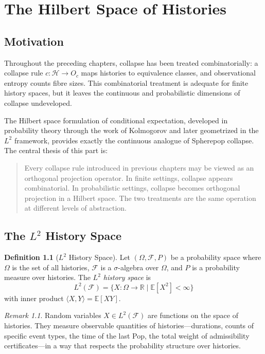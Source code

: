 \documentclass[12pt, a4paper, openany]{book}
\theoremstyle{plain}
\theoremstyle{definition}
\newtheorem{definition}[theorem]{Definition}
\theoremstyle{remark}
\newtheorem{remark}[theorem]{Remark}
\newcommand{\calH}{\mathcal{H}}
\begin{document}
\chapter{The Hilbert Space of Histories}

\section{Motivation}

Throughout the preceding chapters, collapse has been treated combinatorially:
a collapse rule $c : \calH \to O_c$ maps histories to equivalence classes, and
observational entropy counts fibre sizes. This combinatorial treatment is adequate
for finite history spaces, but it leaves the continuous and probabilistic dimensions
of collapse undeveloped.

The Hilbert space formulation of conditional expectation, developed in
probability theory through the work of Kolmogorov and later geometrized in
the $L^2$ framework, provides exactly the continuous analogue of Spherepop
collapse. The central thesis of this part is:

\begin{quote}
Every collapse rule introduced in previous chapters may be viewed as an orthogonal
projection operator. In finite settings, collapse appears combinatorial. In
probabilistic settings, collapse becomes orthogonal projection in a Hilbert space.
The two treatments are the same operation at different levels of abstraction.
\end{quote}

\section{The $L^2$ History Space}

\begin{definition}[$L^2$ History Space]
Let $(\Omega, \mathcal{F}, P)$ be a probability space where $\Omega$ is the
set of all histories, $\mathcal{F}$ is a $\sigma$-algebra over $\Omega$, and
$P$ is a probability measure over histories. The \emph{$L^2$ history space} is
\[
L^2(\mathcal{F}) = \{X : \Omega \to \mathbb{R} \mid \mathbb{E}[X^2] < \infty\}
\]
with inner product $\langle X, Y \rangle = \mathbb{E}[XY]$.
\end{definition}

\begin{remark}
Random variables $X \in L^2(\mathcal{F})$ are functions on the space of histories.
They measure observable quantities of histories---durations, counts of specific
event types, the time of the last Pop, the total weight of admissibility
certificates---in a way that respects the probability structure over histories.
\end{remark}
\end{document}
